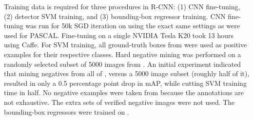 Training data is required for three procedures in R-CNN: (1) CNN fine-tuning, (2) detector SVM training, and (3) bounding-box regressor training.
CNN fine-tuning was run for 50k SGD iteration on \trainvalN using the exact same settings as were used for PASCAL.
Fine-tuning on a single NVIDIA Tesla K20 took 13 hours using Caffe.
For SVM training, all ground-truth boxes from \trainvalN were used as positive examples for their respective classes.
Hard negative mining was performed on a randomly selected subset of 5000 images from \vala.
An initial experiment indicated that mining negatives from all of \vala, versus a 5000 image subset (roughly half of it), resulted in only a 0.5 percentage point drop in mAP, while cutting SVM training time in half.
No negative examples were taken from \train because the annotations are not exhaustive.
The extra sets of verified negative images were not used.
The bounding-box regressors were trained on \vala.

\begin{table}[t]
\centering
\renewcommand{\arraystretch}{1.2}
\renewcommand{\tabcolsep}{1.2mm}
\caption{\textbf{ILSVRC2013 ablation study} of data usage choices, fine-tuning, and bounding-box regression.}
\end{table}

